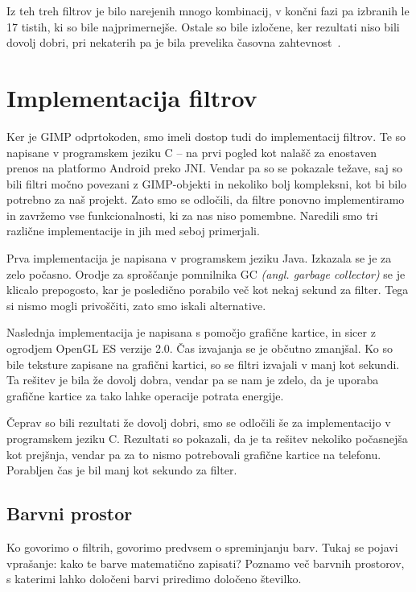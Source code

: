 \documentclass[a4paper, 12pt]{book}
\begin{document}
Iz teh treh filtrov je bilo narejenih mnogo kombinacij, v končni fazi pa
izbranih le 17 tistih, ki so bile najprimernejše. Ostale so bile izločene, ker
rezultati niso bili dovolj dobri, pri nekaterih pa je bila prevelika časovna
zahtevnost~\cite{thesisSamoJuvan}.


\section{Implementacija filtrov}
Ker je GIMP odprtokoden, smo imeli dostop tudi do implementacij filtrov.
Te so napisane v programskem jeziku C -- na prvi pogled kot
nalašč za enostaven prenos na platformo Android preko JNI. Vendar pa so se
pokazale težave, saj so bili filtri močno povezani z GIMP-objekti in nekoliko
bolj kompleksni, kot bi bilo potrebno za naš projekt. Zato smo se odločili, da
filtre ponovno implementiramo in zavržemo vse funkcionalnosti, ki za nas niso
pomembne. Naredili smo tri različne implementacije in jih med seboj primerjali.

Prva implementacija je napisana v programskem jeziku Java. Izkazala se je za
zelo počasno. Orodje za sproščanje pomnilnika GC \textit{(angl. garbage
collector)} se je klicalo prepogosto, kar je posledično porabilo več kot nekaj
sekund za filter. Tega si nismo mogli privoščiti, zato smo iskali alternative.

Naslednja implementacija je napisana s pomočjo grafične kartice, in sicer z
ogrodjem OpenGL ES verzije 2.0. Čas izvajanja se je občutno
zmanjšal. Ko so bile teksture zapisane na grafični kartici, so se filtri
izvajali v manj kot sekundi. Ta rešitev je bila že dovolj dobra, vendar pa se
nam je zdelo, da je uporaba grafične kartice za tako lahke operacije potrata
energije.

Čeprav so bili rezultati že dovolj dobri, smo se odločili še za implementacijo
v programskem jeziku C. Rezultati so pokazali, da je ta rešitev nekoliko
počasnejša kot prejšnja, vendar pa za to nismo potrebovali grafične kartice na
telefonu. Porabljen čas je bil manj kot sekundo za filter.


\subsection{Barvni prostor}
Ko govorimo o filtrih, govorimo predvsem o spreminjanju barv. Tukaj se pojavi
vprašanje: kako te barve matematično zapisati? Poznamo več barvnih
prostorov, s katerimi lahko določeni barvi priredimo določeno številko.
\end{document}
